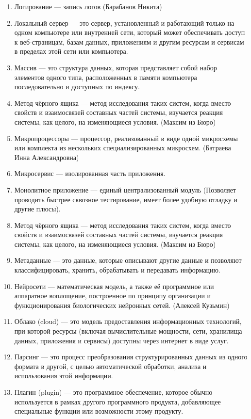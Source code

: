 \documentclass{article}
\begin{document}
\begin{enumerate}
    \item Логирование --- запись логов (Барабанов Никита)
    \item Локальный сервер --- это сервер, установленный и работающий только на одном компьютере или внутренней сети, который может обеспечивать доступ к веб-страницам, базам данных, приложениям и другим ресурсам и сервисам в пределах этой сети или компьютера.
    \item Массив --- это структура данных, которая представляет собой набор элементов одного типа, расположенных в памяти компьютера последовательно и доступных по индексу.
    \item Метод чёрного ящика --- метод исследования таких систем, когда вместо свойств и взаимосвязей составных частей системы, изучается реакция системы, как целого, на изменяющиеся условия. (Максим из Бюро)
    \item Микропроцессоры --- процессор, реализованный в виде одной микросхемы или комплекта из нескольких специализированных микросхем. (Батраева Инна Александровна)
    \item Микросервис --- изолированная часть приложения.
    \item Монолитное приложение --- единый централизованный модуль (Позволяет проводить быстрее сквозное тестирование, имеет более удобную отладку и другие плюсы).
    \item Метод чёрного ящика --- метод исследования таких систем, когда вместо свойств и взаимосвязей составных частей системы, изучается реакция системы, как целого, на изменяющиеся условия. (Максим из Бюро)
    \item Метаданные --- это данные, которые описывают другие данные и позволяют классифицировать, хранить, обрабатывать и передавать информацию.
    \item Нейросети --- математическая модель, а также её программное или аппаратное воплощение, построенное по принципу организации и функционирования биологических нейронных сетей. (Алексей Кузьмин)
    \item Облако (cloud)  --- это модель предоставления информационных технологий, при которой ресурсы (включая вычислительные мощности, сети, хранилища данных, приложения и сервисы) доступны через интернет в виде услуг.
    \item Парсинг --- это процесс преобразования структурированных данных из одного формата в другой, с целью автоматической обработки, анализа и использования этой информации.
    \item Плагин (plugin) --- это программное обеспечение, которое обычно используется в рамках другого программного продукта, добавляющее специальные функции или возможности этому продукту.

\end{enumerate}
\end{document}
